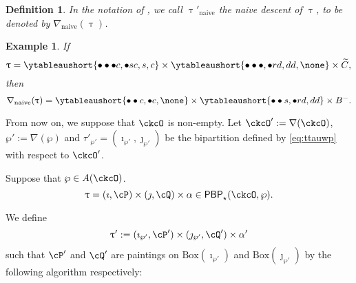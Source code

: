 \documentclass[12pt,a4paper]{amsart}
\let\ytb=\ytableaushort
\newcommand{\CO}{{\mathcal {O}}}
\def\tnaive{\mathrm{naive}}
\def\tauwpp{\tau'_{\wp'}}
\def\uptaupn{\uptau'_{\tnaive}}
\def\DD{\nabla}
\def\DDn{\nabla_{\tnaive}}
\numberwithin{equation}{section}
\newtheorem{defn}[thm]{Definition}
\newtheorem{eg}[thm]{Example}
\theoremstyle{remark}
\def\DD{\nabla}
\newcommand{\BOX}[1]{\mathrm{Box}(#1)}
\def\imathwpp{\imath_{\wp'}}
\def\jmathwpp{\jmath_{\wp'}}
\def\PBP{\mathsf{PBP}}
\def\PBPop#1#2#3#4{\PBP_{#1}^{#2}(#3,#4)}
\newcommand{\PBPOP}[1][]{\PBPop{\star}{#1}{\ckcO}{\wp}}
\begin{document}
\begin{defn}
 In the notation of , we call $\uptaupn$ the naive descent of $\uptau$, to be denoted by $\DDn(\uptau)$.
\end{defn}




 \begin{eg} If
    \[
     \uptau = \ytb{\bullet\bullet\bullet {c},\bullet {s} {c},{s},{c}}
    \times \ytb{\bullet\bullet\bullet ,\bullet {r} {d},{d}{d}, \none}
    \times \widetilde C, \]
   then
   \[
    \nabla_{\mathrm{naive}}(\uptau) =\ytb{\bullet\bullet{c} ,\bullet{c},\none }
    \times  \ytb{\bullet\bullet {s} ,\bullet {r} {d},{d}{d}}\times B^-.
    \]

\end{eg}


From now on, we suppose that $\ckcO$ is non-empty.
Let $\ckcO' := \DD(\ckcO)$, $\wp':=\DD(\wp)$ and $\tauwpp = (\imathwpp,\jmathwpp)$ be the
bipartition defined by \eqref{eq:ttauwp} with respect to $\ckcO'$.

Suppose that $\wp\in A(\ckcO)$.
\[
\uptau=(\imath,\cP)\times(\jmath,\cQ)\times \alpha \in  \PBPOP.
\]


We define
\[
  \uptau' := (\imathwpp, \cP')\times (\jmathwpp, \cQ')\times \alpha'
\]
such that $\cP'$ and $\cQ'$ are paintings on $\BOX{\imath_{\wp'}}$ and
$\BOX{\jmath_{\wp'}}$  %
by the following algorithm respectively:



\end{document}
